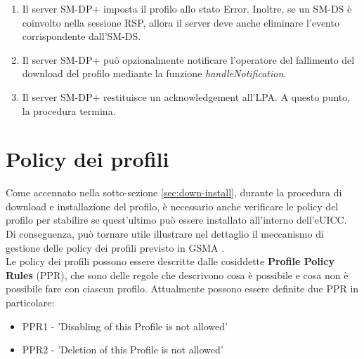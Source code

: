 \documentclass[10pt, oneside]{book}
\begin{document}
\begin{enumerate}
\item Il server SM-DP+ imposta il profilo allo stato Error. Inoltre, se un SM-DS è coinvolto nella sessione RSP, allora il server deve anche eliminare l'evento corrispondente dall'SM-DS.
\item Il server SM-DP+ può opzionalmente notificare l'operatore del fallimento del download del profilo mediante la funzione \textit{handleNotification}.
\item Il server SM-DP+ restituisce un acknowledgement all'LPA. A questo punto, la procedura termina.
\end{enumerate}

\section{Policy dei profili}\label{sec:profile-policy}
Come accennato nella sotto-sezione \ref{sec:down-install}, durante la procedura di download e installazione del profilo, è necessario anche verificare le policy del profilo per stabilire se quest'ultimo può essere installato all'interno dell'eUICC. Di conseguenza, può tornare utile illustrare nel dettaglio il meccanismo di gestione delle policy dei profili previsto in GSMA \cite{GSMA-docs-new}.\\
Le policy dei profili possono essere descritte dalle cosiddette \textbf{Profile Policy Rules} (PPR), che sono delle regole che descrivono cosa è possibile e cosa non è possibile fare con ciascun profilo. Attualmente possono essere definite due PPR in particolare:
\begin{itemize}
\item PPR1 - 'Disabling of this Profile is not allowed'
\item PPR2 - 'Deletion of this Profile is not allowed'
\end{itemize}
\end{document}
